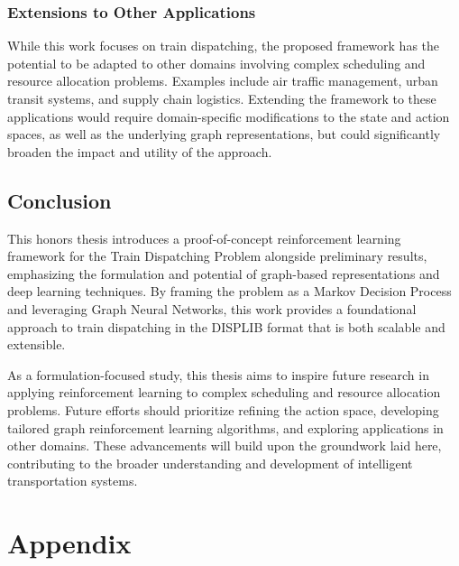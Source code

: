 \documentclass[runningheads]{llncs}
\begin{document}
\subsubsection{Extensions to Other Applications}
While this work focuses on train dispatching, the proposed framework has the potential to be adapted to other domains involving complex scheduling and resource allocation problems. 
Examples include air traffic management, urban transit systems, and supply chain logistics. 
Extending the framework to these applications would require domain-specific modifications to the state and action spaces, as well as the underlying graph representations, but could significantly broaden the impact and utility of the approach.

\subsection{Conclusion}
\label{sss:conclusion}

This honors thesis introduces a proof-of-concept reinforcement learning framework for the Train Dispatching Problem alongside preliminary results, emphasizing the formulation and potential of graph-based representations and deep learning techniques. 
By framing the problem as a Markov Decision Process and leveraging Graph Neural Networks, this work provides a foundational approach to train dispatching in the DISPLIB format that is both scalable and extensible.

As a formulation-focused study, this thesis aims to inspire future research in applying reinforcement learning to complex scheduling and resource allocation problems. 
Future efforts should prioritize refining the action space, developing tailored graph reinforcement learning algorithms, and exploring applications in other domains. 
These advancements will build upon the groundwork laid here, contributing to the broader understanding and development of intelligent transportation systems.


\section{Appendix}
\end{document}
